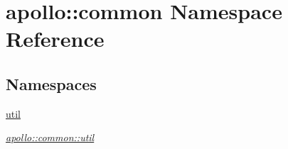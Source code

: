 \hypertarget{namespaceapollo_1_1common}{\section{apollo\-:\-:common Namespace Reference}
\label{namespaceapollo_1_1common}
}
\subsection*{Namespaces}
\begin{DoxyCompactItemize}
\item 
\hyperlink{namespaceapollo_1_1common_1_1util}{util}
\begin{DoxyCompactList}\small\item\em \hyperlink{namespaceapollo_1_1common_1_1util}{apollo\-::common\-::util} \end{DoxyCompactList}\end{DoxyCompactItemize}
